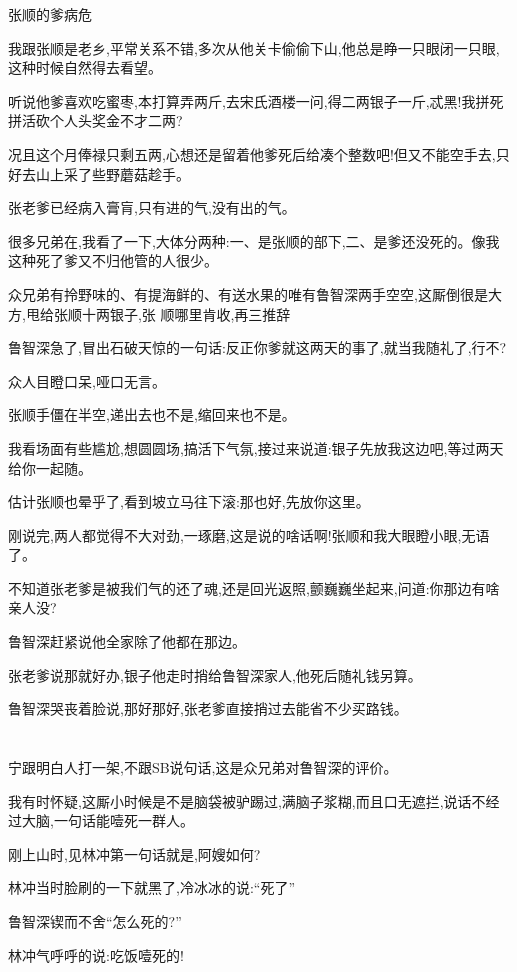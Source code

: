 ﻿\documentclass[12pt]{article}
\begin{document}
张顺的爹病危

我跟张顺是老乡,平常关系不错,多次从他关卡偷偷下山,他总是睁一只眼闭一只眼,这种时候自然得去看望。

听说他爹喜欢吃蜜枣,本打算弄两斤,去宋氏酒楼一问,得二两银子一斤,忒黑!我拼死拼活砍个人头奖金不才二两?

况且这个月俸禄只剩五两,心想还是留着他爹死后给凑个整数吧!但又不能空手去,只好去山上采了些野蘑菇趁手。

张老爹已经病入膏肓,只有进的气,没有出的气。

很多兄弟在,我看了一下,大体分两种:一、是张顺的部下,二、是爹还没死的。像我这种死了爹又不归他管的人很少。

众兄弟有拎野味的、有提海鲜的、有送水果的\dldots 唯有鲁智深两手空空,这厮倒很是大方,甩给张顺十两银子,张
顺哪里肯收,再三推辞

鲁智深急了,冒出石破天惊的一句话:反正你爹就这两天的事了,就当我随礼了,行不?

众人目瞪口呆,哑口无言。

张顺手僵在半空,递出去也不是,缩回来也不是。

我看场面有些尴尬,想圆圆场,搞活下气氛,接过来说道:银子先放我这边吧,等过两天给你一起随。

估计张顺也晕乎了,看到坡立马往下滚:那也好,先放你这里。

刚说完,两人都觉得不大对劲,一琢磨,这是说的啥话啊!张顺和我大眼瞪小眼,无语了。

不知道张老爹是被我们气的还了魂,还是回光返照,颤巍巍坐起来,问道:你那边有啥亲人没?

鲁智深赶紧说他全家除了他都在那边。

张老爹说那就好办,银子他走时捎给鲁智深家人,他死后随礼钱另算。

鲁智深哭丧着脸说,那好那好,张老爹直接捎过去能省不少买路钱。

\section{}

宁跟明白人打一架,不跟SB说句话,这是众兄弟对鲁智深的评价。

我有时怀疑,这厮小时候是不是脑袋被驴踢过,满脑子浆糊,而且口无遮拦,说话不经过大脑,一句话能噎死一群人。

刚上山时,见林冲第一句话就是,阿嫂如何?

林冲当时脸刷的一下就黑了,冷冰冰的说:``死了''

鲁智深锲而不舍``怎么死的?''

林冲气呼呼的说:吃饭噎死的!
\end{document}
